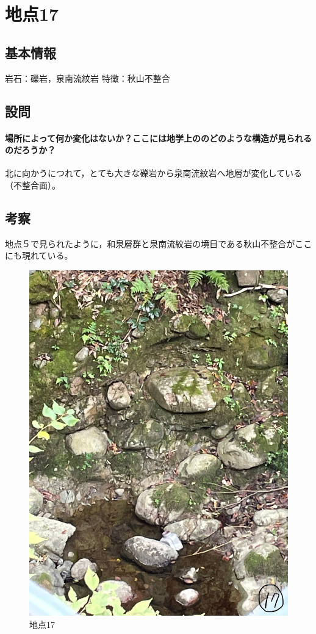\documentclass[uplatex,b5paper]{jsreport}
\begin{document}
  \section{地点17}
    \subsection{基本情報}
    岩石：礫岩，泉南流紋岩
    特徴：秋山不整合
    \subsection{設問}
      \paragraph{場所によって何か変化はないか？ここには地学上ののどのような構造が見られるのだろうか？}
      北に向かうにつれて，とても大きな礫岩から泉南流紋岩へ地層が変化している（不整合面）。
    \subsection{考察}
    地点５で見られたように，和泉層群と泉南流紋岩の境目である秋山不整合がここにも現れている。
  \begin{figure}[h]
    \begin{center}
      \includegraphics[scale=0.15]{files/地学実習/地点17.jpg}
      \caption{地点17}
    \end{center}    
  \end{figure}
  \clearpage
\end{document}
